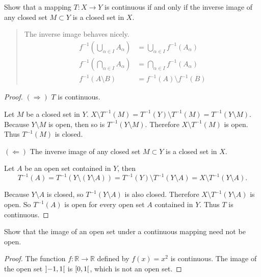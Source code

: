 \begin{exercise}\label{chapter1:section3:exercise14}
    Show that a mapping $T: X\to Y$ is continuous if and only if the inverse image of any closed set $M\subset Y$ is a closed set in $X$.
\end{exercise}

\begin{quote}
    The inverse image behaves nicely.
    \begin{align*}
        f^{-1}(\bigcup_{\alpha\in I}A_{\alpha}) & = \bigcup_{\alpha\in I}f^{-1}(A_{\alpha}) \\
        f^{-1}(\bigcap_{\alpha\in I}A_{\alpha}) & = \bigcap_{\alpha\in I}f^{-1}(A_{\alpha}) \\
        f^{-1}(A\setminus B)                    & = f^{-1}(A)\setminus f^{-1}(B)
    \end{align*}
\end{quote}

\begin{proof}
    $(\Rightarrow)$ $T$ is continuous.

    Let $M$ be a closed set in $Y$. $X\setminus T^{-1}(M) = T^{-1}(Y) \setminus T^{-1}(M) = T^{-1}(Y\setminus M)$. Because $Y\setminus M$ is open, then so is $T^{-1}(Y\setminus M)$. Therefore $X\setminus T^{-1}(M)$ is open. Thus $T^{-1}(M)$ is closed.

    $(\Leftarrow)$ The inverse image of any closed set $M\subset Y$ is a closed set in $X$.

    Let $A$ be an open set contained in $Y$, then
    \[
        T^{-1}(A) = T^{-1}(Y\setminus (Y\setminus A)) = T^{-1}(Y)\setminus T^{-1}(Y\setminus A) = X\setminus T^{-1}(Y\setminus A).
    \]

    Because $Y\setminus A$ is closed, so $T^{-1}(Y\setminus A)$ is also closed. Therefore $X\setminus T^{-1}(Y\setminus A)$ is open. So $T^{-1}(A)$ is open for every open set $A$ contained in $Y$. Thus $T$ is continuous.
\end{proof}

\begin{exercise}\label{chapter1:section3:exercise15}
    Show that the image of an open set under a continuous mapping need not be open.
\end{exercise}

\begin{proof}
    The function $f: \mathbb{R}\to \mathbb{R}$ defined by $f(x) = x^{2}$ is continuous. The image of the open set $\left]{-1, 1}\right[$ is $\left[{0, 1}\right[$, which is not an open set.
\end{proof}

